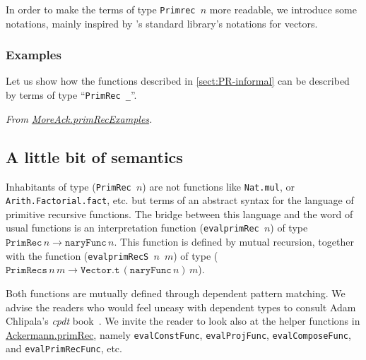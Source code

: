 In order to make the terms of type \texttt{Primrec $n$} more readable, we introduce some notations, mainly inspired by \coq's standard library's notations for vectors.


\subsubsection{Examples}
\label{sect:primrec-examples2}

Let us show how the functions described in \ref{sect:PR-informal} can be described by terms of type ``\texttt{PrimRec \_}''.



\noindent
\emph{From \href{../theories/html/hydras.MoreAck.PrimRecExamples.html}{MoreAck.primRecExamples}.}



\subsection{A little bit of semantics} 
\label{primrec-semantics}

Inhabitants of type (\texttt{PrimRec $n$}) are not \coq{} functions like \texttt{Nat.mul}, or \texttt{Arith.Factorial.fact}, etc. but terms of an abstract syntax for the language of primitive recursive functions. The bridge between this language and the word of usual functions
is an interpretation function (\texttt{evalprimRec $n$})  of type
$\texttt{PrimRec}\,n \rightarrow  \texttt{naryFunc}\,n$.
This function is defined by mutual recursion,  together with the  function 
(\texttt{evalprimRecS $n$ $m$}) of type 
($\texttt{PrimRecs}\,n\,m \rightarrow  \texttt{Vector.t}\,(\texttt{naryFunc}\,n)\,m$).


Both functions are mutually defined through dependent pattern matching. We advise the readers who 
would feel uneasy with dependent types to consult Adam Chlipala's \emph{cpdt}  book~\cite{chlipalacpdt2011}. We invite the 
 reader  to look also at the helper functions in
\href{../theories/html/hydras.Ackermann.primRec.html}{Ackermann.primRec}, namely \texttt{evalConstFunc}, \texttt{evalProjFunc}, \texttt{evalComposeFunc}, and \texttt{evalPrimRecFunc}, etc.

\vspace{4pt}

